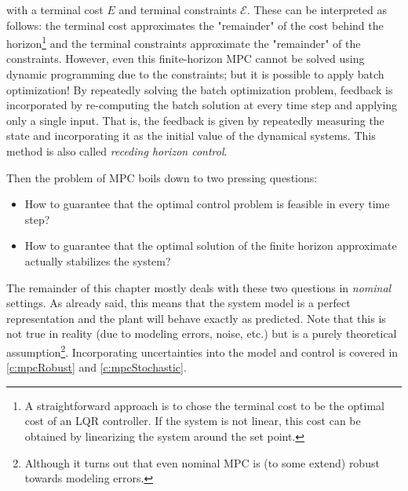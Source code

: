 	with a terminal cost \(E\) and terminal constraints \(\mathcal{E}\). These can be interpreted as follows: the terminal cost approximates the "remainder" of the cost behind the horizon\footnote{A straightforward approach is to chose the terminal cost to be the optimal cost of an LQR controller. If the system is not linear, this cost can be obtained by linearizing the system around the set point.} and the terminal constraints approximate the "remainder" of the constraints. However, even this finite-horizon MPC cannot be solved using dynamic programming due to the constraints; but it is possible to apply batch optimization! By repeatedly solving the batch optimization problem, feedback is incorporated by re-computing the batch solution at every time step and applying only a single input. That is, the feedback is given by repeatedly measuring the state and incorporating it as the initial value of the dynamical systems. This method is also called \emph{receding horizon control}.

	Then the problem of MPC boils down to two pressing questions:
	\begin{itemize}
		\item How to guarantee that the optimal control problem is feasible in every time step?
		\item How to guarantee that the optimal solution of the finite horizon approximate actually stabilizes the system?
	\end{itemize}
	The remainder of this chapter mostly deals with these two questions in \emph{nominal} settings. As already said, this means that the system model is a perfect representation and the plant will behave exactly as predicted. Note that this is not true in reality (due to modeling errors, noise, etc.) but is a purely theoretical assumption\footnote{Although it turns out that even nominal MPC is (to some extend) robust towards modeling errors.}. Incorporating uncertainties into the model and control is covered in \autoref{c:mpcRobust} and \ref{c:mpcStochastic}.

